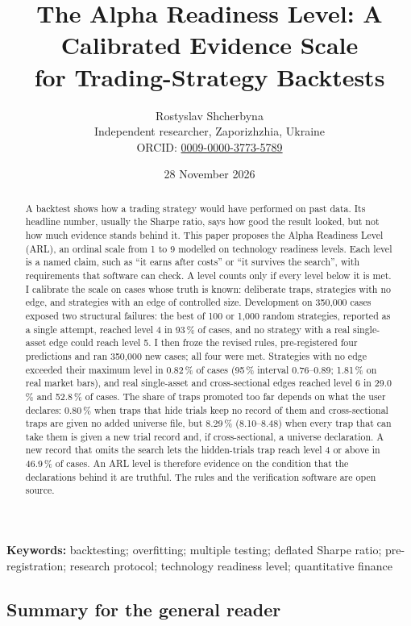 \documentclass[11pt]{article}
\title{The Alpha Readiness Level: A Calibrated Evidence Scale\\ for Trading-Strategy Backtests}
\author{Rostyslav Shcherbyna\\ Independent researcher, Zaporizhzhia, Ukraine\\
ORCID: \href{https://orcid.org/0009-0000-3773-5789}{0009-0000-3773-5789}}
\date{28 November 2026}
\begin{document}
\maketitle

\begin{abstract}
A backtest shows how a trading strategy would have performed on past data. Its headline number, usually the Sharpe
ratio, says how good the result looked, but not how much evidence stands behind it. This paper proposes the Alpha
Readiness Level (ARL), an ordinal scale from 1 to 9 modelled on technology readiness levels. Each level is a named
claim, such as ``it earns after costs'' or ``it survives the search'', with requirements that software can check. A
level counts only if every level below it is met. I calibrate the scale on cases whose truth is known: deliberate
traps, strategies with no edge, and strategies with an edge of controlled size. Development on 350,000 cases exposed
two structural failures: the best of 100 or 1,000 random strategies, reported as a single attempt, reached level 4 in
93\,\% of cases, and no strategy with a real single-asset edge could reach level 5. I then froze the revised rules,
pre-registered four predictions and ran 350,000 new cases; all four were met. Strategies with no edge exceeded their
maximum level in 0.82\,\% of cases (95\,\% interval 0.76--0.89; 1.81\,\% on real market bars), and real single-asset
and cross-sectional edges reached level 6 in 29.0\,\% and 52.8\,\% of cases. The share of traps promoted too far
depends on what the user declares: 0.80\,\% when traps that hide trials keep no record of them and cross-sectional traps
are given no added universe file, but 8.29\,\% (8.10--8.48) when every trap that can take them is given a new trial
record and, if cross-sectional, a universe declaration. A new record that omits the search lets the hidden-trials trap
reach level 4 or above in 46.9\,\% of cases. An ARL level is therefore evidence on the condition that the declarations
behind it are truthful. The rules and the verification software are open source.
\end{abstract}

\noindent\textbf{Keywords:} backtesting; overfitting; multiple testing; deflated Sharpe ratio; pre-registration;
research protocol; technology readiness level; quantitative finance

\subsection*{Summary for the general reader}
\end{document}
